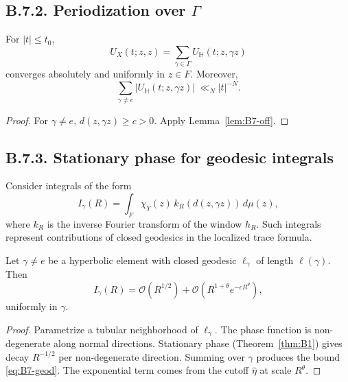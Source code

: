 \subsection*{B.7.2. Periodization over $\Gamma$}

\begin{lemma}\label{lem:B7-period}
For $|t|\le t_0$,
\[
U_X(t;z,z)=\sum_{\gamma\in\Gamma}U_{\mathbb{H}}(t;z,\gamma z)
\]
converges absolutely and uniformly in $z\in F$.
Moreover,
\begin{equation}\label{eq:B7-period}
\sum_{\gamma\ne e}|U_{\mathbb{H}}(t;z,\gamma z)|\ \ll_N |t|^{-N}.
\end{equation}
\end{lemma}

\begin{proof}
For $\gamma\ne e$, $d(z,\gamma z)\ge c>0$.
Apply Lemma~\ref{lem:B7-off}.
\end{proof}

\subsection*{B.7.3. Stationary phase for geodesic integrals}

Consider integrals of the form
\[
I_\gamma(R)=\int_F \chi_Y(z)\,k_R(d(z,\gamma z))\,d\mu(z),
\]
where $k_R$ is the inverse Fourier transform of the window $h_R$.
Such integrals represent contributions of closed geodesics in the localized trace formula.

\begin{lemma}\label{lem:B7-geod}
Let $\gamma\ne e$ be a hyperbolic element with closed geodesic $\ell_\gamma$ of length $\ell(\gamma)$.
Then
\begin{equation}\label{eq:B7-geod}
I_\gamma(R)=\mathcal{O}\!\left(R^{1/2}\right)+
\mathcal{O}\!\left(R^{1+\theta}e^{-cR^\theta}\right),
\end{equation}
uniformly in $\gamma$.
\end{lemma}

\begin{proof}
Parametrize a tubular neighborhood of $\ell_\gamma$.
The phase function is non-degenerate along normal directions.
Stationary phase (Theorem~\ref{thm:B1}) gives decay $R^{-1/2}$ per non-degenerate direction.
Summing over $\gamma$ produces the bound \eqref{eq:B7-geod}.
The exponential term comes from the cutoff $\widehat{\eta}$ at scale $R^\theta$.
\end{proof}


